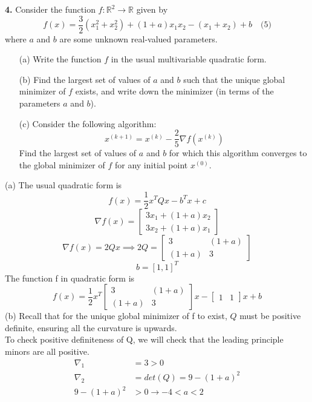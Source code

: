 \documentclass[12pt]{article}
\begin{document}
\begin{mybluebox}
  \textbf{4.} Consider the function \( f : \mathbb{R}^2 \to \mathbb{R} \) given by
\[
f(x) = \frac{3}{2} \left( x_1^2 + x_2^2 \right) + (1 + a)x_1 x_2 - (x_1 + x_2) + b \quad \text{(5)}
\]
where \( a \) and \( b \) are some unknown real-valued parameters.

\begin{itemize}
    \item[(a)] Write the function \( f \) in the usual multivariable quadratic form.
    
    \item[(b)] Find the largest set of values of \( a \) and \( b \) such that the unique global minimizer of \( f \) exists, and write down the minimizer (in terms of the parameters \( a \) and \( b \)).
    
    \item[(c)] Consider the following algorithm:
    \[
    x^{(k+1)} = x^{(k)} - \frac{2}{5} \nabla f \left( x^{(k)} \right)
    \]
    Find the largest set of values of \( a \) and \( b \) for which this algorithm converges to the global minimizer of \( f \) for any initial point \( x^{(0)} \).
\end{itemize}
\end{mybluebox}
(a) The usual quadratic form is 
\[f(x) = \frac{1}{2}x^TQx-b^Tx+c\]
\[\nabla f(x) = \begin{bmatrix}
  3x_1+(1+a)x_2 \\ 3x_2+(1+a)x_1
\end{bmatrix}\]
\[\nabla f(x) = 2Qx \implies 2Q = \begin{bmatrix}
  3 & (1+a) \\ (1+a) & 3
\end{bmatrix}\]
\[b = [1, 1]^T\]
The function f in quadratic form is
\[f(x) = \frac{1}{2}x^T \begin{bmatrix}
  3 & (1+a) \\(1+a) & 3
\end{bmatrix}x - \begin{bmatrix}
  1 & 1
\end{bmatrix}x + b\]
(b) Recall that for the unique global minimizer of f to exist, $Q$ must be positive definite, ensuring all the curvature is upwards.\\
To check positive definiteness of Q, we will check that the leading principle minors are all positive.\\
\begin{align*}
  \nabla_1 &= 3 > 0\\
  \nabla_2 &= det(Q) = 9 - (1+a)^2 \\
  9 - (1+a)^2 &> 0 \rightarrow -4 < a < 2
\end{align*}
\end{document}
